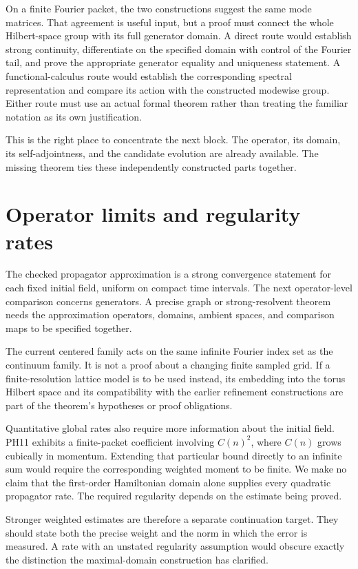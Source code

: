 On a finite Fourier packet, the two constructions suggest the same mode matrices. That agreement is useful input, but a proof must connect the whole Hilbert-space group with its full generator domain. A direct route would establish strong continuity, differentiate on the specified domain with control of the Fourier tail, and prove the appropriate generator equality and uniqueness statement. A functional-calculus route would establish the corresponding spectral representation and compare its action with the constructed modewise group. Either route must use an actual formal theorem rather than treating the familiar notation as its own justification.

This is the right place to concentrate the next block. The operator, its domain, its self-adjointness, and the candidate evolution are already available. The missing theorem ties these independently constructed parts together.

\section{Operator limits and regularity rates}
The checked propagator approximation is a strong convergence statement for each fixed initial field, uniform on compact time intervals. The next operator-level comparison concerns generators. A precise graph or strong-resolvent theorem needs the approximation operators, domains, ambient spaces, and comparison maps to be specified together.

The current centered family acts on the same infinite Fourier index set as the continuum family. It is not a proof about a changing finite sampled grid. If a finite-resolution lattice model is to be used instead, its embedding into the torus Hilbert space and its compatibility with the earlier refinement constructions are part of the theorem's hypotheses or proof obligations.

Quantitative global rates also require more information about the initial field. PH11 exhibits a finite-packet coefficient involving $C(n)^2$, where $C(n)$ grows cubically in momentum. Extending that particular bound directly to an infinite sum would require the corresponding weighted moment to be finite. We make no claim that the first-order Hamiltonian domain alone supplies every quadratic propagator rate. The required regularity depends on the estimate being proved.

Stronger weighted estimates are therefore a separate continuation target. They should state both the precise weight and the norm in which the error is measured. A rate with an unstated regularity assumption would obscure exactly the distinction the maximal-domain construction has clarified.

